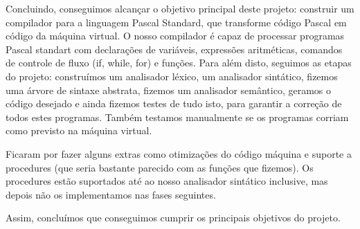 \documentclass[12pt,a4paper]{report}
\begin{document}
Concluindo, conseguimos alcançar o objetivo principal deste projeto: construir um compilador para a linguagem Pascal Standard, que transforme código Pascal em código da máquina virtual.
O nosso compilador é capaz de processar programas Pascal standart com declarações de variáveis, expressões aritméticas, comandos de controle de fluxo (if, while, for) e funções. Para além disto,
seguimos as etapas do projeto: construímos um analisador léxico, um analisador sintático, fizemos uma árvore de sintaxe abstrata, fizemos um analisador semântico, geramos o código desejado
e ainda fizemos testes de tudo isto, para garantir a correção de todos estes programas. Também testamos manualmente se os programas corriam como previsto na máquina virtual.

\vspace{1em}

Ficaram por fazer alguns extras como otimizações do código máquina e suporte a procedures (que seria bastante parecido
com as funções que fizemos).
Os procedures estão suportados até ao nosso analisador sintático inclusive, mas depois não os implementamos nas fases seguintes.

\vspace{1em}

Assim, concluímos que conseguimos cumprir os principais objetivos do projeto. 
\end{document}
